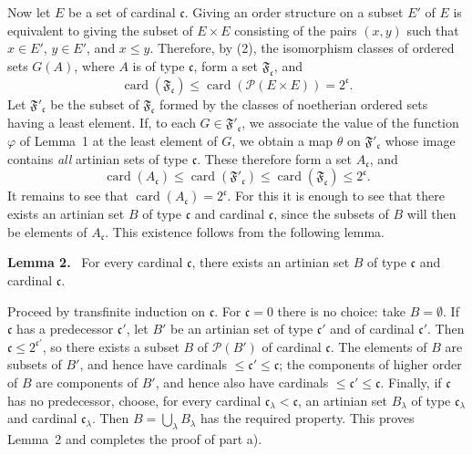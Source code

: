 \documentclass[11pt]{article}
\newcommand{\card}{\operatorname{card}}
\newcommand{\Pset}{\mathcal{P}}
\newenvironment{statement}[1]{\par\medskip\noindent\textbf{#1.}\ }{\par\medskip}
\begin{document}
Now let \(E\) be a set of cardinal \(\mathfrak c\). Giving an order structure on a subset \(E'\) of \(E\) is equivalent to giving the subset of \(E\times E\) consisting of the pairs \((x,y)\) such that \(x\in E'\), \(y\in E'\), and \(x\leq y\). Therefore, by (2), the isomorphism classes of ordered sets \(G(A)\), where \(A\) is of type \(\mathfrak c\), form a set \(\mathfrak F_{\mathfrak c}\), and
\[
 \card(\mathfrak F_{\mathfrak c})\leq\card(\Pset(E\times E))=2^{\mathfrak c}.
\]
Let \(\mathfrak F'_{\mathfrak c}\) be the subset of \(\mathfrak F_{\mathfrak c}\) formed by the classes of noetherian ordered sets having a least element. If, to each \(G\in\mathfrak F'_{\mathfrak c}\), we associate the value of the function \(\varphi\) of Lemma~1 at the least element of \(G\), we obtain a map \(\theta\) on \(\mathfrak F'_{\mathfrak c}\) whose image contains \emph{all} artinian sets of type \(\mathfrak c\). These therefore form a set \(A_{\mathfrak c}\), and
\[
 \card(A_{\mathfrak c})\leq\card(\mathfrak F'_{\mathfrak c})
 \leq\card(\mathfrak F_{\mathfrak c})\leq2^{\mathfrak c}.
\]
It remains to see that \(\card(A_{\mathfrak c})=2^{\mathfrak c}\). For this it is enough to see that there exists an artinian set \(B\) of type \(\mathfrak c\) and cardinal \(\mathfrak c\), since the subsets of \(B\) will then be elements of \(A_{\mathfrak c}\). This existence follows from the following lemma.

\begin{statement}{Lemma 2}
For every cardinal \(\mathfrak c\), there exists an artinian set \(B\) of type \(\mathfrak c\) and cardinal \(\mathfrak c\).
\end{statement}
Proceed by transfinite induction on \(\mathfrak c\). For \(\mathfrak c=0\) there is no choice: take \(B=\emptyset\). If \(\mathfrak c\) has a predecessor \(\mathfrak c'\), let \(B'\) be an artinian set of type \(\mathfrak c'\) and of cardinal \(\mathfrak c'\). Then \(\mathfrak c\leq2^{\mathfrak c'}\), so there exists a subset \(B\) of \(\Pset(B')\) of cardinal \(\mathfrak c\). The elements of \(B\) are subsets of \(B'\), and hence have cardinals \(\leq\mathfrak c'\leq\mathfrak c\); the components of higher order of \(B\) are components of \(B'\), and hence also have cardinals \(\leq\mathfrak c'\leq\mathfrak c\). Finally, if \(\mathfrak c\) has no predecessor, choose, for every cardinal \(\mathfrak c_\lambda<\mathfrak c\), an artinian set \(B_\lambda\) of type \(\mathfrak c_\lambda\) and cardinal \(\mathfrak c_\lambda\). Then \(B=\bigcup_\lambda B_\lambda\) has the required property. This proves Lemma~2 and completes the proof of part a).
\end{document}
